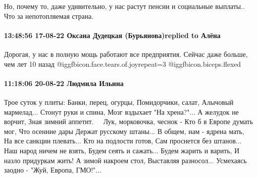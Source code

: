 Но, почему то, даже удивительно, у нас растут пенсии и социальные выплаты.. Что
за непотопляемая страна.

\paragraph{13:48:56 17-08-22 Оксана Дудецкая (Бурьянова)replied to Алёна}

Дорогая, у нас в полную мощь работают все предприятия. Сейчас даже больше, чем
лет 10 назад  @igg{fbicon.face.tears.of.joy}{repeat=3}  @igg{fbicon.biceps.flexed} 

\paragraph{11:18:06 20-08-22 Людмила Ильина}

Трое суток у плиты:
Банки, перец, огурцы,
Помидорчики, салат,
Алычовый мармелад...
Стонут руки и спина,
Мозг вздыхает "На хрена?"...
А желудок не ворчит,
Зная зимний аппетит.
⠀
Лук, морковочка, чеснок -
Кто б в Европе думать мог,
Что осенние дары
Держат русскому штаны...
В общем, нам - ядрена мать,
На все санкции плевать...
Кто на подлости готов,
Сам проснется без штанов...
⠀
Наш народ ничем не взять,
Будем сеять и сажать...
Будем жарить и варить,
И назло придуркам жить!
А зимой накроем стол,
Выставляя разносол...
Усмехаясь заодно -
"Жуй, Европа, ГМО!"...
